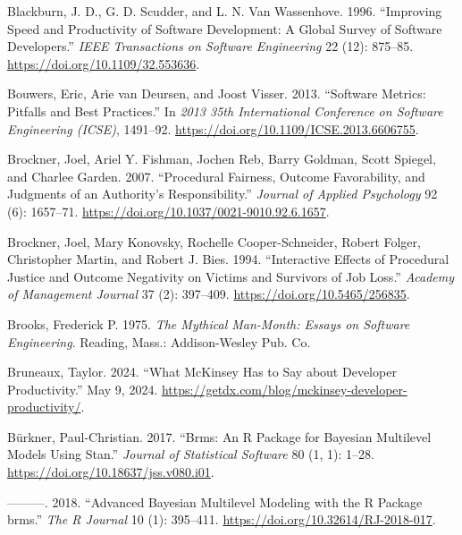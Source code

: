 \documentclass[
]{article}
\newlength{\cslhangindent}
\newenvironment{CSLReferences}[2] %
 {\begin{list}{}{%
  \setlength{\itemindent}{0pt}
  \setlength{\leftmargin}{0pt}
  \setlength{\parsep}{0pt}
  \ifodd #1
   \setlength{\leftmargin}{\cslhangindent}
   \setlength{\itemindent}{-1\cslhangindent}
  \fi
  \setlength{\itemsep}{#2\baselineskip}}}
 {\end{list}}
\begin{document}
\begin{CSLReferences}{1}{0}
Blackburn, J. D., G. D. Scudder, and L. N. Van Wassenhove. 1996.
{``Improving Speed and Productivity of Software Development: A Global
Survey of Software Developers.''} \emph{IEEE Transactions on Software
Engineering} 22 (12): 875--85. \url{https://doi.org/10.1109/32.553636}.

Bouwers, Eric, Arie van Deursen, and Joost Visser. 2013. {``Software
Metrics: {Pitfalls} and Best Practices.''} In \emph{2013 35th
{International Conference} on {Software Engineering} ({ICSE})},
1491--92. \url{https://doi.org/10.1109/ICSE.2013.6606755}.

Brockner, Joel, Ariel Y. Fishman, Jochen Reb, Barry Goldman, Scott
Spiegel, and Charlee Garden. 2007. {``Procedural Fairness, Outcome
Favorability, and Judgments of an Authority's Responsibility.''}
\emph{Journal of Applied Psychology} 92 (6): 1657--71.
\url{https://doi.org/10.1037/0021-9010.92.6.1657}.

Brockner, Joel, Mary Konovsky, Rochelle Cooper-Schneider, Robert Folger,
Christopher Martin, and Robert J. Bies. 1994. {``Interactive {Effects}
of {Procedural Justice} and {Outcome Negativity} on {Victims} and
{Survivors} of {Job Loss}.''} \emph{Academy of Management Journal} 37
(2): 397--409. \url{https://doi.org/10.5465/256835}.

Brooks, Frederick P. 1975. \emph{The Mythical Man-Month: Essays on
Software Engineering}. Reading, Mass.: Addison-Wesley Pub. Co.

Bruneaux, Taylor. 2024. {``What {McKinsey} Has to Say about Developer
Productivity.''} May 9, 2024.
\url{https://getdx.com/blog/mckinsey-developer-productivity/}.

Bürkner, Paul-Christian. 2017. {``Brms: {An R Package} for {Bayesian
Multilevel Models Using Stan}.''} \emph{Journal of Statistical Software}
80 (1, 1): 1--28. \url{https://doi.org/10.18637/jss.v080.i01}.

---------. 2018. {``Advanced {Bayesian} Multilevel Modeling with the {R}
Package {brms}.''} \emph{The R Journal} 10 (1): 395--411.
\url{https://doi.org/10.32614/RJ-2018-017}.


\end{CSLReferences}
\end{document}
